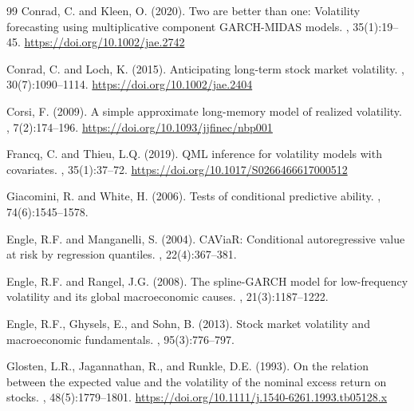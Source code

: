 \documentclass[12pt,a4paper]{article}
\begin{document}
\begin{thebibliography}{99}
Conrad, C. and Kleen, O. (2020).
\newblock Two are better than one: Volatility forecasting using multiplicative component GARCH-MIDAS models.
, 35(1):19--45.
\newblock \url{https://doi.org/10.1002/jae.2742}

Conrad, C. and Loch, K. (2015).
\newblock Anticipating long-term stock market volatility.
, 30(7):1090--1114.
\newblock \url{https://doi.org/10.1002/jae.2404}

Corsi, F. (2009).
\newblock A simple approximate long-memory model of realized volatility.
, 7(2):174--196.
\newblock \url{https://doi.org/10.1093/jjfinec/nbp001}

Francq, C. and Thieu, L.Q. (2019).
\newblock QML inference for volatility models with covariates.
, 35(1):37--72.
\newblock \url{https://doi.org/10.1017/S0266466617000512}

Giacomini, R. and White, H. (2006).
\newblock Tests of conditional predictive ability.
, 74(6):1545--1578.

Engle, R.F. and Manganelli, S. (2004).
\newblock CAViaR: Conditional autoregressive value at risk by regression quantiles.
, 22(4):367--381.

Engle, R.F. and Rangel, J.G. (2008).
\newblock The spline-GARCH model for low-frequency volatility and its global macroeconomic causes.
, 21(3):1187--1222.

Engle, R.F., Ghysels, E., and Sohn, B. (2013).
\newblock Stock market volatility and macroeconomic fundamentals.
, 95(3):776--797.

Glosten, L.R., Jagannathan, R., and Runkle, D.E. (1993).
\newblock On the relation between the expected value and the volatility of the nominal excess return on stocks.
, 48(5):1779--1801.
\newblock \url{https://doi.org/10.1111/j.1540-6261.1993.tb05128.x}


\end{thebibliography}
\end{document}
